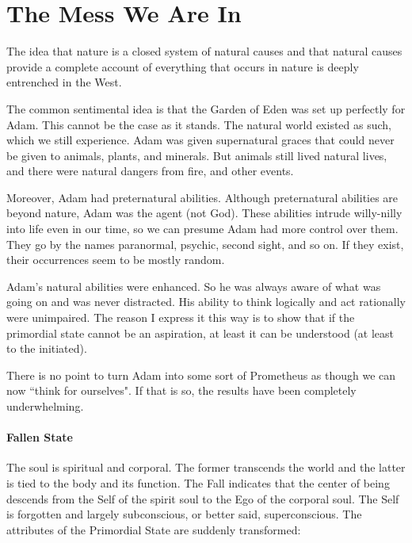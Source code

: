\section{The Mess We Are In}

\begin{quotex}
The idea that nature is a closed system of natural causes and that natural causes provide a complete account of everything that occurs in nature is deeply entrenched in the West. 

\end{quotex}
The common sentimental idea is that the Garden of Eden was set up perfectly for Adam. This cannot be the case as it stands. The natural world existed as such, which we still experience. Adam was given supernatural graces that could never be given to animals, plants, and minerals. But animals still lived natural lives, and there were natural dangers from fire, and other events.

Moreover, Adam had preternatural abilities. Although preternatural abilities are beyond nature, Adam was the agent (not God). These abilities intrude willy-nilly into life even in our time, so we can presume Adam had more control over them. They go by the names paranormal, psychic, second sight, and so on. If they exist, their occurrences seem to be mostly random.

Adam's natural abilities were enhanced. So he was always aware of what was going on and was never distracted. His ability to think logically and act rationally were unimpaired. The reason I express it this way is to show that if the primordial state cannot be an aspiration, at least it can be understood (at least to the initiated).

There is no point to turn Adam into some sort of Prometheus as though we can now ``think for ourselves". If that is so, the results have been completely underwhelming.

\paragraph{Fallen State}
The soul is spiritual and corporal. The former transcends the world and the latter is tied to the body and its function. The Fall indicates that the center of being descends from the Self of the spirit soul to the Ego of the corporal soul. The Self is forgotten and largely subconscious, or better said, superconscious. The attributes of the Primordial State are suddenly transformed:

